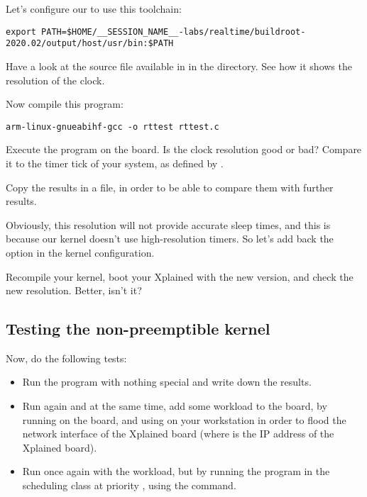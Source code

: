 Let's configure our  to use this toolchain:

\small
\begin{verbatim}
export PATH=$HOME/__SESSION_NAME__-labs/realtime/buildroot-2020.02/output/host/usr/bin:$PATH
\end{verbatim}
\normalsize

Have a look at the  source file available in
 in the  directory. See how it shows the
resolution of the  clock.

Now compile this program:
\begin{verbatim}
arm-linux-gnueabihf-gcc -o rttest rttest.c
\end{verbatim}

Execute the program on the board. Is the clock resolution good or bad?
Compare it to the timer tick of your system, as defined by
.

Copy the results in a file, in order to be able to compare them
with further results.

Obviously, this resolution will not provide accurate sleep times, and
this is because our kernel doesn't use high-resolution timers. So
let's add back the  option in the kernel
configuration.

Recompile your kernel, boot your Xplained with the new version, and
check the new resolution. Better, isn't it?

\subsection{Testing the non-preemptible kernel}

Now, do the following tests:
\begin{itemize}
\item Run the  program with nothing special and write
  down the results.
\item Run  again and at the same time, add some workload
  to the board, by running 
  on the board, and using  on your
  workstation in order to flood the network interface of the Xplained
  board (where  is the IP address of the Xplained
  board).
\item Run  once again with the workload, but by running
  the program in the  scheduling class at priority
  , using the  command.
\end{itemize}

